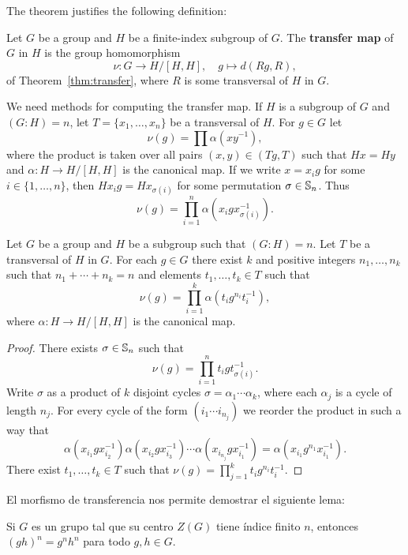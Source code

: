 The theorem justifies the following definition: 

\begin{definition}
	Let $G$ be a group and $H$ be a finite-index subgroup of $G$. The
	\textbf{transfer map} of $G$ in $H$ is the group homomorphism 
	\[
		\nu\colon G\to H/[H,H],
		\quad
		g\mapsto d(Rg,R),
	\]
	of Theorem~\ref{thm:transfer}, where $R$ is some transversal of $H$ in $G$.
\end{definition}

We need methods for computing the transfer map. If $H$ is a subgroup of 
$G$
and $(G:H)=n$, let $T=\{x_1,\dots,x_n\}$ be a transversal of $H$. For $g\in G$ let  
\[
	\nu(g)=\prod \alpha(xy^{-1}),
\]
where the product is taken over all pairs $(x,y)\in (Tg,T)$ such that $Hx=Hy$
and $\alpha\colon H\to H/[H,H]$ is the canonical map. 
If we write 
$x=x_ig$ for some $i\in\{1,\dots,n\}$, then  
$Hx_ig=Hx_{\sigma(i)}$ for some permutation $\sigma\in\mathbb{S}_n$. Thus 
\[
	\nu(g)=\prod_{i=1}^n\alpha(x_igx_{\sigma(i)}^{-1}).
\]

\begin{lemma}
	\label{lem:transfer}
	Let $G$ be a group and $H$ be a subgroup such that $(G:H)=n$. Let 
	$T$ be a transversal of $H$ in $G$. 
	For each $g\in G$ there exist $k$ and 
	positive integers 
	$n_1,\dots,n_k$ such that $n_1+\cdots+n_k=n$ and elements 
	$t_1,\dots,t_k\in T$ such that  
	\[
		\nu(g)=\prod_{i=1}^k \alpha(t_ig^{n_i}t_i^{-1}),
	\]
	where $\alpha\colon H\to H/[H,H]$ is the canonical map.
\end{lemma}

\begin{proof}
	There exists $\sigma\in\mathbb{S}_n$ such that 
	\[
	\nu(g)=\prod_{i=1}^n t_igt_{\sigma(i)}^{-1}. 
	\]
	Write $\sigma$ as a product of $k$ disjoint cycles
	$\sigma=\alpha_1\cdots\alpha_k$, where each $\alpha_j$ is a cycle of length 
	$n_j$. For every cycle of the form $(i_1\cdots i_{n_j})$
	we reorder the product in such a way that 
	\[
		\alpha(x_{i_1}gx_{i_2}^{-1})\alpha(x_{i_2}gx_{i_3}^{-1})\cdots \alpha(x_{i_{n_j}}gx_{i_1}^{-1})=\alpha(x_{i_1}g^{n_1}x_{i_1}^{-1}).
	\]
	There exist $t_1,\dots,t_k\in T$ such that 
	$\nu(g)=\prod_{j=1}^k t_ig^{n_i}t_i^{-1}$. 
\end{proof}

El morfismo de transferencia nos permite demostrar el siguiente
lema:

\begin{lemma}
	\label{lem:center}
	Si $G$ es un grupo tal que su centro $Z(G)$ tiene índice finito $n$, entonces
	$(gh)^n=g^nh^n$ para todo $g,h\in G$.	
\end{lemma}

